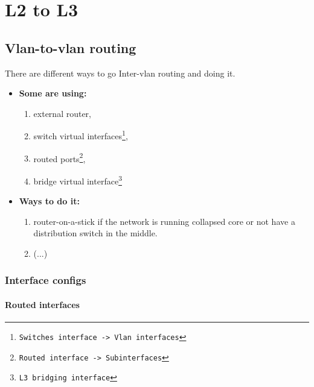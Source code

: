 
\chapter{L2 to L3}

\section{Vlan-to-vlan routing}


There are different ways to go  Inter-vlan routing and doing it.

\begin{itemize}
    \item \textbf{Some are using:}
    \begin{enumerate}
        \item external router,
        \item switch virtual interfaces\footnote{\texttt{Switches interface -> Vlan interfaces}},
        \item routed ports\footnote{\texttt{Routed interface -> Subinterfaces}},
        \item bridge virtual interface\footnote{\texttt{L3 bridging interface}}
    \end{enumerate}
    \item \textbf{Ways to do it:}
    \begin{enumerate}
        \item router-on-a-stick if the network is running collapsed core or not have a distribution switch in the middle.
        \item (...)
    \end{enumerate}
\end{itemize}

\pagebreak

\subsection{Interface configs}

\subsubsection{Routed interfaces}

